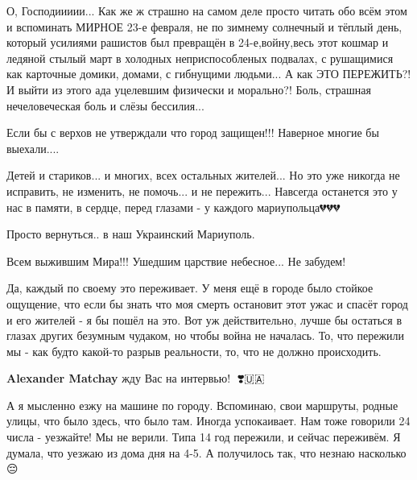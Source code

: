 
О, Господиииии... Как же ж страшно на самом деле просто читать обо всём этом и
вспоминать МИРНОЕ 23-е февраля, не по зимнему солнечный и тёплый день, который
усилиями рашистов был превращён в 24-е,войну,весь этот кошмар и ледяной стылый
март в холодных неприспособленых подвалах, с рушащимися как карточные домики,
домами, с гибнущими людьми... А как ЭТО ПЕРЕЖИТЬ?! И выйти из этого ада
уцелевшим физически и морально?! Боль, страшная нечеловеческая боль и слёзы
бессилия...


Если бы с верхов не утверждали что город защищен!!! Наверное многие бы выехали....


Детей и стариков... и многих, всех остальных жителей... Но это уже никогда не
исправить, не изменить, не помочь... и не пережить... Навсегда останется это у
нас в памяти, в сердце, перед глазами - у каждого мариупольца💔💔💔


Просто вернуться.. в наш Украинский Мариуполь.


Всем выжившим Мира!!! Ушедшим царствие небесное... Не забудем!


Да, каждый по своему это переживает. У меня ещё в городе было стойкое ощущение,
что если бы знать что моя смерть остановит этот ужас и спасёт город и его
жителей - я бы пошёл на это. Вот уж действительно, лучше бы остаться в глазах
других безумным чудаком, но чтобы война не началась. То, что пережили мы - как
будто какой-то разрыв реальности, то, что не должно происходить.

\begin{itemize} %
\textbf{Alexander Matchay} жду Вас на интервью! 🙏❣️🇺🇦
\end{itemize} %


А я мысленно езжу на машине по городу. Вспоминаю, свои маршруты, родные улицы,
что было здесь, что было там. Иногда успокаивает. Нам тоже говорили 24 числа -
уезжайте! Мы не верили. Типа 14 год пережили, и сейчас переживём. Я думала, что
уезжаю из дома дня на 4-5. А получилось так, что незнаю насколько 😔


